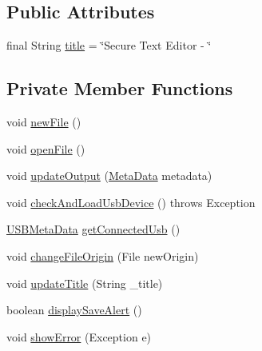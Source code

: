 \subsection*{Public Attributes}
\begin{DoxyCompactItemize}
\item 
final String \mbox{\hyperlink{classlogic_1_1_text_editor_a86db3912b74760463213b2936f20f08f}{title}} = \char`\"{}Secure Text Editor -\/ \char`\"{}
\end{DoxyCompactItemize}
\subsection*{Private Member Functions}
\begin{DoxyCompactItemize}
\item 
void \mbox{\hyperlink{classlogic_1_1_text_editor_a03b71fe113e6549963206a005913176a}{new\+File}} ()
\item 
void \mbox{\hyperlink{classlogic_1_1_text_editor_a52437fbd2159a657602a75860c18051f}{open\+File}} ()
\item 
void \mbox{\hyperlink{classlogic_1_1_text_editor_ab03a3aa2457f10c003cc12c08e806e43}{update\+Output}} (\mbox{\hyperlink{classpersistence_1_1_meta_data}{Meta\+Data}} metadata)
\item 
void \mbox{\hyperlink{classlogic_1_1_text_editor_aa70bd7664e38609c8a3697ecb39795b5}{check\+And\+Load\+Usb\+Device}} ()  throws Exception 	
\item 
\mbox{\hyperlink{classpersistence_1_1_u_s_b_meta_data}{U\+S\+B\+Meta\+Data}} \mbox{\hyperlink{classlogic_1_1_text_editor_abc9623f0e47f9ffaf55f6489ef2965f4}{get\+Connected\+Usb}} ()
\item 
void \mbox{\hyperlink{classlogic_1_1_text_editor_a40b3be71ec12cbe4b4fb10ce4bdab6c5}{change\+File\+Origin}} (File new\+Origin)
\item 
void \mbox{\hyperlink{classlogic_1_1_text_editor_a3e994bcaa8e3e6983c8867003347af20}{update\+Title}} (String \+\_\+title)
\item 
boolean \mbox{\hyperlink{classlogic_1_1_text_editor_aed9266aefb6a34921fdb12776a4c84cc}{display\+Save\+Alert}} ()
\item 
void \mbox{\hyperlink{classlogic_1_1_text_editor_a5fc087a73d335d9a76ebff363f073a8d}{show\+Error}} (Exception e)
\end{DoxyCompactItemize}
